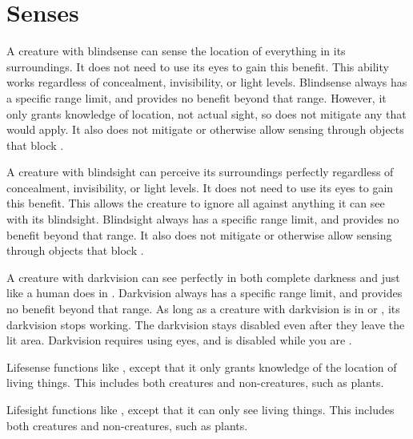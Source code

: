 \newpage
\section{Senses}\label{Senses}

  A creature with blindsense can sense the location of everything in its surroundings.
  It does not need to use its eyes to gain this benefit.
  This ability works regardless of concealment, invisibility, or light levels.
  Blindsense always has a specific range limit, and provides no benefit beyond that range.
  However, it only grants knowledge of location, not actual sight, so does not mitigate any  that would apply.
  It also does not mitigate  or otherwise allow sensing through objects that block .

  A creature with blindsight can perceive its surroundings perfectly regardless of concealment, invisibility, or light levels.
  It does not need to use its eyes to gain this benefit.
  This allows the creature to ignore all  against anything it can see with its blindsight.
  Blindsight always has a specific range limit, and provides no benefit beyond that range.
  It also does not mitigate  or otherwise allow sensing through objects that block .

  A creature with darkvision can see perfectly in both complete darkness and  just like a human does in .
  Darkvision always has a specific range limit, and provides no benefit beyond that range.
  As long as a creature with darkvision is in  or , its darkvision stops working.
  The darkvision  stays disabled even after they leave the lit area.
  Darkvision requires using eyes, and is disabled while you are \dazzled.

  Lifesense functions like , except that it only grants knowledge of the location of living things.
  This includes both creatures and non-creatures, such as plants.

  Lifesight functions like , except that it can only see living things.
  This includes both creatures and non-creatures, such as plants.

